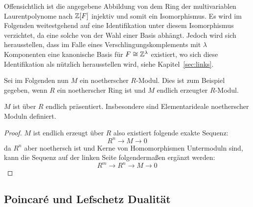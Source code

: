 \begin{bem}
	Offensichtlich ist die angegebene Abbildung von dem Ring der multivariablen Laurentpolynome nach $\mathbb{Z}[F]$ injektiv und somit ein Isomorphismus. Es wird im Folgenden weitestgehend auf eine Identifikation unter diesem Isomorphismus verzichtet, da eine solche von der Wahl einer Basis abhängt. Jedoch wird sich herausstellen, dass im Falle eines Verschlingungskomplements mit $\lambda$ Komponenten eine kanonische Basis für $F\cong \mathbb{Z}^\lambda$ existiert, wo sich diese Identifikation als nützlich herausstellen wird, siehe Kapitel~\ref{sec:links}.
\end{bem}


Sei im Folgenden nun $M$ ein noetherscher $R$-Modul. Dies ist zum Beispiel gegeben, wenn $R$ ein noetherscher Ring ist und $M$ endlich erzeugter $R$-Modul.
\begin{lem}
	$M$ ist über $R$ endlich präsentiert. Insbesondere sind Elementarideale noetherscher Moduln definiert.
\end{lem}
\begin{proof}
	$M$ ist endlich erzeugt über $R$ also existiert folgende exakte Sequenz:
	\[
		R^n \to M \to 0
	\]
	da $R^n$ aber noethersch ist und Kerne von Homomorphismen Untermoduln sind, kann die Sequenz auf der linken Seite folgendermaßen ergänzt werden:
	\[
		R^m \to R^n \to M \to 0
	\]
\end{proof}


\subsection{Poincaré und Lefschetz Dualität}
\label{sec:poinc}

